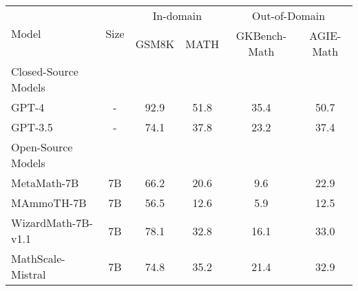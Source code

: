\begin{table}[ht]
\centering\small
\begin{tabular}{lccccc}
\toprule
\multicolumn{1}{l|}{\multirow{2}{*}{Model}}         & \multicolumn{1}{c|}{\multirow{2}{*}{Size}} & \multicolumn{2}{c|}{In-domain}                               & \multicolumn{2}{c}{Out-of-Domain}           \\ \cmidrule{3-6} 
\multicolumn{1}{l|}{}                               & \multicolumn{1}{c|}{}                      & \multicolumn{1}{c|}{GSM8K} & \multicolumn{1}{c|}{MATH}       & \multicolumn{1}{c|}{GKBench-Math}     & AGIE-Math        \\ 
\midrule
Closed-Source Models                                &                                            &                            &                                 &                      &                      \\ 
\midrule
\multicolumn{1}{l|}{GPT-4}                          & \multicolumn{1}{c|}{-}                     & 92.9                       & \multicolumn{1}{c|}{51.8}       & 35.4                 & 50.7                 \\
\multicolumn{1}{l|}{GPT-3.5}                        & \multicolumn{1}{c|}{-}                     & 74.1                       & \multicolumn{1}{c|}{37.8}       & 23.2                 & 37.4                 \\ 
\midrule
Open-Source Models                                  &                                            &                            &                                 &                      &                      \\ 
\midrule
\multicolumn{1}{l|}{MetaMath-7B}                    & \multicolumn{1}{c|}{7B}                    & 66.2                       & \multicolumn{1}{c|}{20.6}       & 9.6                  & 22.9                 \\
\multicolumn{1}{l|}{MAmmoTH-7B}                     & \multicolumn{1}{c|}{7B}                    & 56.5                       & \multicolumn{1}{c|}{12.6}       & 5.9                  & 12.5                 \\
\multicolumn{1}{l|}{WizardMath-7B-v1.1}             & \multicolumn{1}{c|}{7B}                    & 78.1                       & \multicolumn{1}{c|}{32.8}       & 16.1                 & 33.0                 \\
\multicolumn{1}{l|}{MathScale-Mistral}              & \multicolumn{1}{c|}{7B}                    & 74.8                       & \multicolumn{1}{c|}{35.2}       & 21.4                 & 32.9                 \\ 

\end{tabular}
\end{table}
